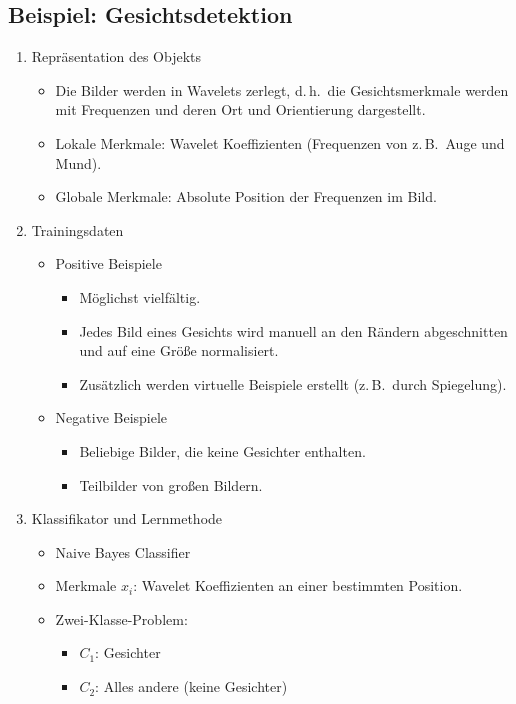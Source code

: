 \documentclass[a4paper, 11pt, accentcolor = tud3b]{tudreport}
\renewcommand{\dh}{d.\,h.~}
\newcommand{\zB}{z.\,B.~}
\begin{document}
			\subsection{Beispiel: Gesichtsdetektion}
				\begin{enumerate}
					\item Repräsentation des Objekts
						\begin{itemize}
							\item Die Bilder werden in Wavelets zerlegt, \dh die Gesichtsmerkmale werden mit Frequenzen und deren Ort und Orientierung dargestellt.
							\item Lokale Merkmale: Wavelet Koeffizienten (Frequenzen von \zB Auge und Mund).
							\item Globale Merkmale: Absolute Position der Frequenzen im Bild.
						\end{itemize}
					\item Trainingsdaten
						\begin{itemize}
							\item Positive Beispiele
								\begin{itemize}
									\item Möglichst vielfältig.
									\item Jedes Bild eines Gesichts wird manuell an den Rändern abgeschnitten und auf eine Größe normalisiert.
									\item Zusätzlich werden virtuelle Beispiele erstellt (\zB durch Spiegelung).
								\end{itemize}
							\item Negative Beispiele
								\begin{itemize}
									\item Beliebige Bilder, die keine Gesichter enthalten.
									\item Teilbilder von großen Bildern.
								\end{itemize}
						\end{itemize}
					\item Klassifikator und Lernmethode
						\begin{itemize}
							\item Naive Bayes Classifier
							\item Merkmale \(x_i\): Wavelet Koeffizienten an einer bestimmten Position.
							\item Zwei-Klasse-Problem:
								\begin{itemize}
									\item \(C_1\): Gesichter
									\item \(C_2\): Alles andere (keine Gesichter)

\end{itemize}
\end{itemize}
\end{enumerate}
\end{document}
